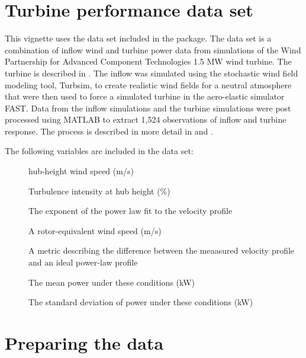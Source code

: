 \documentclass[nojss]{jss}\usepackage[]{graphicx}\usepackage[]{color}
\newcommand{\pname}{windnrg}
\begin{document}
\section{Turbine performance data set}
This vignette uses the  data set included in the \pkg{\pname} package. The  data set is a combination of inflow wind and turbine power data from simulations of the Wind Partnership for Advanced Component Technologies 1.5 MW wind turbine. The turbine is described in \citet{Poore_2003_a, Malcolm_32495}. The inflow was simulated using the stochastic wind field modeling tool, Turbsim, to create realistic wind fields for a neutral atmosphere that were then used to force a simulated turbine in the aero-elastic simulator FAST. Data from the inflow simulations and the turbine simulations were post processed using MATLAB to extract 1,524 observations of inflow and turbine response. The process is described in more detail in \citet{Clifton_2013_a} and \citet{Clifton_2013_d}. 

The following variables are included in the  data set:
\begin{description}
\item[]{hub-height wind speed (m/s)}
\item[]{Turbulence intensity at hub height (\%)}
\item[]{The exponent of the power law fit to the velocity profile}
\item[]{A rotor-equivalent wind speed (m/s)}
\item[]{A metric describing the difference between the meaasured velocity profile and an ideal power-law profile}
\item[]{The mean power under these conditions (kW)}
\item[]{The standard deviation of power under these conditions (kW)}
\end{description}

\section{Preparing the data}
\end{document}

